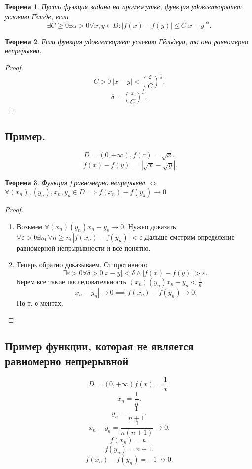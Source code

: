 \documentclass{scrartcl}
\newtheorem{theorem}{Теорема}
\begin{document}
\begin{theorem}
	Пусть функция задана на промежутке, функция удовлетворятет условию Гёльде,
	если
	\[
		\exists  C \ge  0 \exists  \alpha > 0 \forall  x, y \in D : |f(x)-f(y)|\le  C|x - y|^{\alpha}
		.\]
\end{theorem}
\begin{theorem}
	Если функция удовлетворяет условию Гёльдера, то она равномерно непрерывна.
\end{theorem}
\begin{proof}
	\[
		C > 0 ~  |x - y| < (\frac{\varepsilon}{C})^{\frac{1}{\alpha}}
		.\]
	\[
		\delta = (\frac{\varepsilon}{C})^{\frac{1}{\alpha}}
		.\]
\end{proof}
\subsection{Пример.}
\[
	D = (0,+\infty) , f(x) = \sqrt{x}
	.\]
\[
	|f(x) - f(y)| = |\sqrt{x}  - \sqrt{y} |
	.\]
\begin{theorem}
	Функция f равномерно непрерывна $\iff$ $\forall  (x_{n}), (y_{n}), x_{n}, y_{n} \in D
		\implies f(x_{n}) - f(y_{n}) \to 0$
\end{theorem}
\begin{proof}
	\begin{enumerate}
		\item
		      Возьмем $\forall (x_{n}) (y_{n}) x_{n} - y_{n} \to 0$.
		      Нужно доказать $\forall \varepsilon >0 \exists  n_0 \forall  n\ge n_0
			      |f(x_{n}) - f(y_{n})| < \varepsilon$
		      Дальше смотрим определение равномерной непрырывности и все понятно.
		\item
		      Теперь обратно доказываем. От противного
		      \[
			      \exists  \varepsilon > 0 \forall \delta > 0 |x - y| < \delta \land |f(x) - f(y)| > \varepsilon
			      .\]
		      Берем все такие последовательность $(x_{n}) (y_{n}) x_{n} - y_{n} < \frac{1}{n}$
		      \[
			      |x_{n} - y_{n}| \to 0 \implies f(x_{n}) - f(y_{n}) \to 0
			      .\]
		      По т. о ментах.
	\end{enumerate}
\end{proof}
\subsection{Пример функции, которая не является равномерно непрерывной}
\[
	D = (0,+\infty) f(x) = \frac{1}{x}
	.\]
\[
	x_{n} = \frac{1}{n}
	.\]
\[
	y_{n} = \frac{1}{n + 1}
	.\]
\[
	x_{n} - y_{n}= \frac{1}{n(n + 1)} \to 0
	.\]
\[
	f(x_{n}) = n
	.\]
\[
	f(y_{n}) = n + 1
	.\]
\[
	f(x_{n}) - f(y_{n}) = -1 \not \to 0
	.\]
\end{document}
